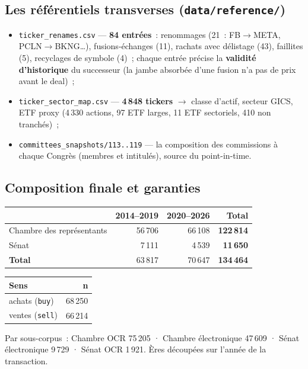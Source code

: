 \documentclass[11pt,a4paper]{article}
\newcommand{\co}[1]{\texttt{\small #1}}
\begin{document}
\subsection{Les référentiels transverses (\co{data/reference/})}
\begin{itemize}[nosep,leftmargin=1.5em]
\item \co{ticker_renames.csv} — \textbf{84 entrées}~: renommages (21~: FB$\to$META, PCLN$\to$BKNG\dots),
fusions-échanges (11), rachats avec délistage (43), faillites (5), recyclages de symbole (4)~; chaque
entrée précise la \textbf{validité d'historique} du successeur (la jambe absorbée d'une fusion n'a pas de
prix avant le deal)~;
\item \co{ticker_sector_map.csv} — \textbf{4\,848 tickers} $\rightarrow$ classe d'actif, secteur GICS, ETF
proxy (4\,330 actions, 97 ETF larges, 11 ETF sectoriels, 410 non tranchés)~;
\item \co{committees_snapshots/113..119} — la composition des commissions à chaque Congrès (membres et
intitulés), source du point-in-time.
\end{itemize}

\subsection{Composition finale et garanties}
\begin{center}\small
\begin{tabular}{l rr r}
\toprule
& \bfseries 2014--2019 & \bfseries 2020--2026 & \bfseries Total\\
\midrule
{\color{houseC}Chambre des représentants} & 56\,706 & 66\,108 & \textbf{122\,814} \\
{\color{senateC}Sénat} & 7\,111 & 4\,539 & \textbf{11\,650} \\
\midrule
\bfseries Total & 63\,817 & 70\,647 & \bfseries 134\,464 \\
\bottomrule
\end{tabular}
\qquad
\begin{tabular}{l r}
\toprule
\bfseries Sens & \bfseries n\\
\midrule
achats (\co{buy}) & 68\,250 \\
ventes (\co{sell}) & 66\,214 \\
\bottomrule
\end{tabular}
\end{center}
{\footnotesize Par sous-corpus~: Chambre OCR 75\,205 · Chambre électronique 47\,609 · Sénat électronique
9\,729 · Sénat OCR 1\,921. Ères découpées sur l'année de la transaction.}
\end{document}

